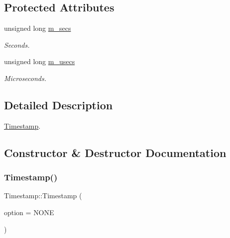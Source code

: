 \subsection*{Protected Attributes}
\begin{DoxyCompactItemize}
\item 
\mbox{\label{classDUtils_1_1Timestamp_a88b8dff916bb011ef4142ca5cc655425}} 
unsigned long \hyperlink{classDUtils_1_1Timestamp_a88b8dff916bb011ef4142ca5cc655425}{m\+\_\+secs}
\begin{DoxyCompactList}\small\item\em Seconds. \end{DoxyCompactList}\item 
\mbox{\label{classDUtils_1_1Timestamp_afb8947a2cf3b04919f782f4490ca0935}} 
unsigned long \hyperlink{classDUtils_1_1Timestamp_afb8947a2cf3b04919f782f4490ca0935}{m\+\_\+usecs}
\begin{DoxyCompactList}\small\item\em Microseconds. \end{DoxyCompactList}\end{DoxyCompactItemize}


\subsection{Detailed Description}
\hyperlink{classDUtils_1_1Timestamp}{Timestamp}. 

\subsection{Constructor \& Destructor Documentation}
\mbox{\label{classDUtils_1_1Timestamp_a7edd67789d60b27acbee7f591ed3e2da}} 
\subsubsection{\texorpdfstring{Timestamp()}{Timestamp()}}
{\footnotesize\ttfamily Timestamp\+::\+Timestamp (\begin{DoxyParamCaption}\item[{\hyperlink{classDUtils_1_1Timestamp_a5a8a3cb7f9e0f73bf11fce42688b06c8}{Timestamp\+::t\+Options}}]{option = {\ttfamily NONE} }\end{DoxyParamCaption})}

